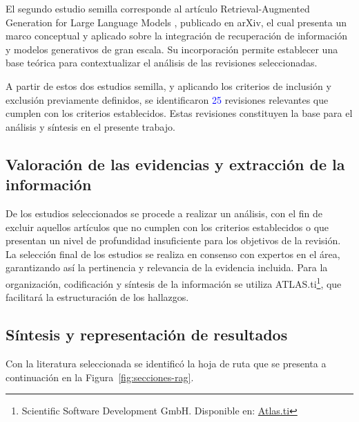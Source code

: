 El segundo estudio semilla corresponde al artículo Retrieval-Augmented Generation for Large Language Models \textcite{gao2023rag}, publicado en
arXiv,
el cual presenta un marco conceptual y aplicado sobre la integración de recuperación de información y modelos generativos de gran escala. Su incorporación permite 
establecer una base teórica para contextualizar el análisis de las revisiones seleccionadas.

A partir de estos dos estudios semilla, y aplicando los criterios de inclusión y exclusión previamente definidos, se identificaron \textcolor{blue}{25} revisiones 
relevantes que cumplen con los criterios establecidos. 
Estas revisiones constituyen la base para el análisis y síntesis en el presente trabajo.



\subsection{Valoración de las evidencias y extracción de la información}  
De los estudios seleccionados se procede a realizar un análisis,  
con el fin de excluir aquellos artículos que no cumplen con los criterios establecidos  
o que presentan un nivel de profundidad insuficiente para los objetivos de la revisión.  
La selección final de los estudios se realiza en consenso con expertos en el área,  
garantizando así la pertinencia y relevancia de la evidencia incluida.  
Para la organización, codificación y síntesis de la  
información se utiliza ATLAS.ti\footnote{Scientific Software Development GmbH. Disponible en: \href{https://atlasti.com/es}{Atlas.ti}},  
que facilitará la estructuración de los hallazgos.  





\subsection{Síntesis y representación de resultados}
Con la literatura seleccionada se identificó la hoja de ruta que se presenta a continuación en la Figura~\ref{fig:secciones-rag}.


